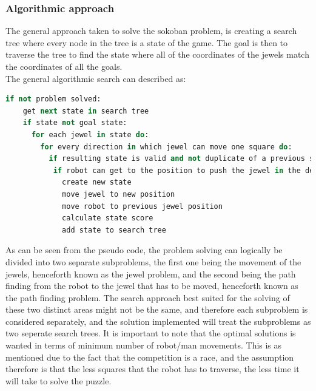 \subsubsection{Algorithmic approach}
The general approach taken to solve the sokoban problem, is creating a search tree where every node in the tree is a state of the game. The goal is then to traverse the tree to find the state where all of the coordinates of the jewels match the coordinates of all the goals.\\
The general algorithmic search can described as:

\begin{lstlisting}[language=Ruby, frame=single, basicstyle=\tiny, caption={Deadlock detection pseudo code}, label={code:sokoalgo}]
if not problem solved:
	get next state in search tree
	if state not goal state:
	  for each jewel in state do:
	    for every direction in which jewel can move one square do:
		  if resulting state is valid and not duplicate of a previous state:
		   if robot can get to the position to push the jewel in the desired direction:
			 create new state				
			 move jewel to new position
			 move robot to previous jewel position
			 calculate state score
			 add state to search tree	
\end{lstlisting}

As can be seen from the pseudo code, the problem solving can logically be divided into two separate subproblems, the first one being the movement of the jewels, henceforth known as the jewel problem, and the second being the path finding from the robot to the jewel that has to be moved, henceforth known as the path finding problem. 
The search approach best suited for the solving of these two distinct areas might not be the same, and therefore each subproblem is considered separately, and the solution implemented will treat the subproblems as two seperate search trees. 
It is important to note that the optimal solutions is wanted in terms of minimum number of robot/man movements. This is as mentioned due to the fact that the competition is a race, and the assumption therefore is that the less squares that the robot has to traverse, the less time it will take to solve the puzzle.
